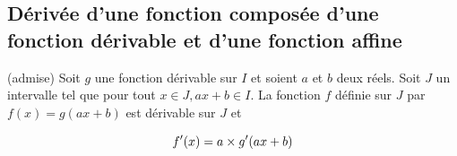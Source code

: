 \documentclass[12pt]{article}
\theoremstyle{break}
\begin{document}
\subsection{Dérivée d'une fonction composée d'une fonction dérivable et d'une fonction affine}
\begin{proposition}{(admise)} 
Soit $g$ une fonction dérivable sur $I$ et soient $a$ et $b$ deux réels. Soit $J$ un intervalle tel que pour tout $x \in J, a x+b \in I$. La fonction $f$ définie sur $J$ par $f(x)=g(a x+b)$ est dérivable sur $J$ et

$$
f^{\prime}(x)=a \times g^{\prime}(a x+b)
$$

\end{proposition}

\end{document}
